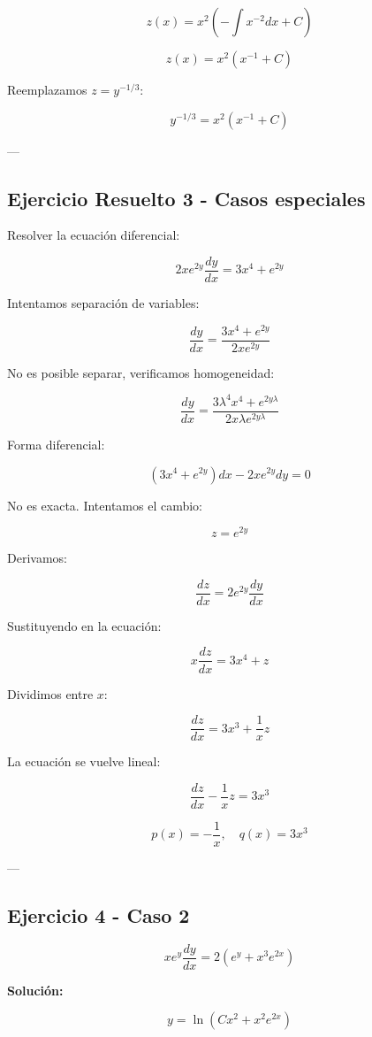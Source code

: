 \[
z(x) = x^2 \left(-\int x^{-2} dx + C\right)
\]

\[
z(x) = x^2 \left(x^{-1} + C\right)
\]

Reemplazamos \( z = y^{-1/3} \):

\[
y^{-1/3} = x^2 \left(x^{-1} + C\right)
\]

---

\subsection {Ejercicio Resuelto 3 - Casos especiales}

Resolver la ecuación diferencial:

\[
2x e^{2y} \frac{dy}{dx} = 3x^4 + e^{2y}
\]

Intentamos separación de variables:

\[
\frac{dy}{dx} = \frac{3x^4 + e^{2y}}{2x e^{2y}}
\]

No es posible separar, verificamos homogeneidad:

\[
\frac{dy}{dx} = \frac{3 \lambda^4 x^4 + e^{2y \lambda}}{2x \lambda e^{2y \lambda}}
\]

Forma diferencial:

\[
(3x^4 + e^{2y}) dx - 2x e^{2y} dy = 0
\]

No es exacta. Intentamos el cambio:

\[
z = e^{2y}
\]

Derivamos:

\[
\frac{dz}{dx} = 2e^{2y} \frac{dy}{dx}
\]

Sustituyendo en la ecuación:

\[
x \frac{dz}{dx} = 3x^4 + z
\]

Dividimos entre \( x \):

\[
\frac{dz}{dx} = 3x^3 + \frac{1}{x} z
\]

La ecuación se vuelve lineal:

\[
\frac{dz}{dx} - \frac{1}{x} z = 3x^3
\]

\[
p(x) = -\frac{1}{x}, \quad q(x) = 3x^3
\]

---

\subsection {Ejercicio 4 - Caso 2}

\[
x e^y \frac{dy}{dx} = 2(e^y + x^3 e^{2x})
\]

\textbf{Solución:}

\[
y = \ln \left( Cx^2 + x^2 e^{2x} \right)
\]

